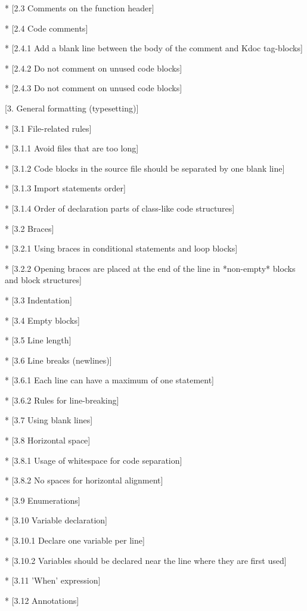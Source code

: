 * [2.3 Comments on the function header]

* [2.4 Code comments]

    * [2.4.1 Add a blank line between the body of the comment and Kdoc tag-blocks]

    * [2.4.2 Do not comment on unused code blocks]

    * [2.4.3 Do not comment on unused code blocks]

    

[3. General formatting (typesetting)]

* [3.1 File-related rules]

    * [3.1.1 Avoid files that are too long]

    * [3.1.2 Code blocks in the source file should be separated by one blank line]

    * [3.1.3 Import statements order]  

    * [3.1.4 Order of declaration parts of class-like code structures]      

* [3.2 Braces]    

    * [3.2.1 Using braces in conditional statements and loop blocks]           

    * [3.2.2 Opening braces are placed at the end of the line in *non-empty* blocks and block structures]               

* [3.3 Indentation]            

* [3.4 Empty blocks] 

* [3.5 Line length] 

* [3.6 Line breaks (newlines)] 

    * [3.6.1 Each line can have a maximum of one statement] 

    * [3.6.2 Rules for line-breaking] 

* [3.7 Using blank lines]

* [3.8 Horizontal space]

    * [3.8.1 Usage of whitespace for code separation] 

    * [3.8.2 No spaces for horizontal alignment] 

* [3.9 Enumerations]

* [3.10 Variable declaration]

    * [3.10.1 Declare one variable per line]

    * [3.10.2 Variables should be declared near the line where they are first used]

* [3.11 'When' expression]  

* [3.12 Annotations]  

